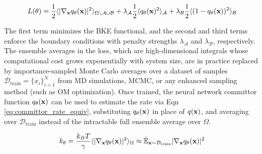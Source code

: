 \begin{equation}
    \label{eq:committor_loss}
    L(\theta) = \frac{1}{2} \langle | \nabla_{\mathbf{x}} q_\theta(\mathbf{x})| ^2 \rangle_{\Omega \backslash \mathcal{A} \cup \mathcal{B}} + \lambda_\mathcal{A} \frac{1}{2} \langle q_\theta(\mathbf{x}) ^2 \rangle_\mathcal{A} + \lambda_\mathcal{B} \frac{1}{2} \langle (1-q_\theta(\mathbf{x}))^2 \rangle_\mathcal{B}
\end{equation}

The first term minimizes the BKE functional, and the second and third terms enforce the boundary conditions with penalty strengths $\lambda_\mathcal{A}$ and $\lambda_\mathcal{B}$, respectively. The ensemble averages in the loss, which are high-dimensional integrals whose computational cost grows exponentially with system size, are in practice replaced by importance-sampled Monte Carlo averages over a dataset of samples $\mathcal{D}_\text{train} = \{ x_i \}_{i=1}^N
$ from MD simulations, MCMC, or any enhanced sampling method (such as OM optimization). Once trained, the neural network committor function $q_\theta(\mathbf{x})$ can be used to estimate the rate via Eqn \ref{eq:committor_rate_equiv}, substituting $q_\theta(\mathbf{x})$ in place of $q(\mathbf{x})$, and averaging over $\mathcal{D}_\text{train}$ instead of the intractable full ensemble average over $\Omega$. 

\begin{equation}
    k_\theta = \frac{k_BT}{\gamma}\langle |\nabla_{\mathbf{x}} q_\theta(\mathbf{x})|^2 \rangle_\Omega \approx \hat{\mathbb{E}}_{\mathbf{x} \sim \mathcal{D}_\text{train}} |\nabla_{\mathbf{x}} q_\theta(\mathbf{x})|^2 
\end{equation}

